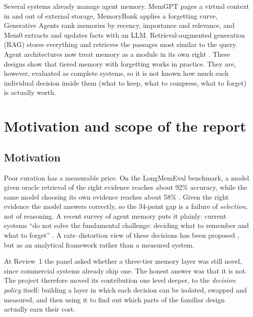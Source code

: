 Several systems already manage agent memory. MemGPT \cite{packer2023memgpt}
pages a virtual context in and out of external storage, MemoryBank
\cite{zhong2024memorybank} applies a forgetting curve, Generative Agents
\cite{park2023generative} rank memories by recency, importance and relevance,
and Mem0 \cite{chhikara2025mem0} extracts and updates facts with an LLM.
Retrieval-augmented generation (RAG) \cite{lewis2020rag} stores everything and
retrieves the passages most similar to the query. Agent architectures now
treat memory as a module in its own right \cite{sumers2024coala}. These
designs show that tiered memory with forgetting works in practice. They are,
however, evaluated as complete systems, so it is not known how much each
individual decision inside them (what to keep, what to compress, what to
forget) is actually worth.

\section{Motivation and scope of the report}

\subsection{Motivation}
Poor curation has a measurable price. On the LongMemEval benchmark, a model
given oracle retrieval of the right evidence reaches about 92\% accuracy, while
the same model choosing its own evidence reaches about 58\%
\cite{wu2024longmemeval}. Given the right evidence the model answers
correctly, so the 34-point gap is a failure of \emph{selection}, not of
reasoning. A recent survey of agent memory puts it plainly: current systems
``do not solve the fundamental challenge: deciding what to remember and what
to forget'' \cite{zhang2024memorysurvey}. A rate--distortion view of these
decisions \cite{shannon1959rd,cover2006elements} has been proposed
\cite{colaco2026rd}, but as an analytical framework rather than a measured
system.

At Review~1 the panel asked whether a three-tier memory layer was still novel,
since commercial systems already ship one. The honest answer was that it is
not. The project therefore moved its contribution one level deeper, to the
\emph{decision policy} itself: building a layer in which each decision can be
isolated, swapped and measured, and then using it to find out which parts of
the familiar design actually earn their cost.

